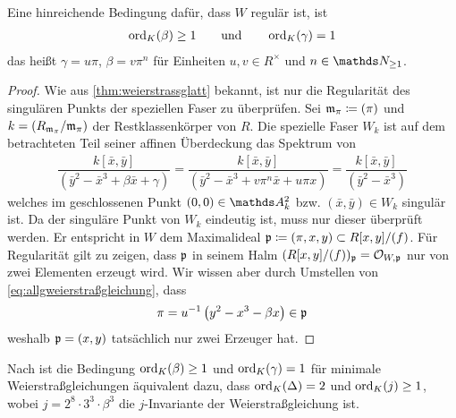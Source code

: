 \begin{Korollar}\label{thm:c1red}
  \label{bem:bedregweierstraßmodell}
  Eine hinreichende Bedingung dafür, dass $W$ regulär ist, ist
  \begin{gather*}
    \operatorname{ord}_{K}(\beta)\geq 1
    \qquad\text{und}\qquad
    \operatorname{ord}_{K}(\gamma)=1
  \end{gather*}
  das heißt $\gamma=u\pi$, $\beta=v\pi^n$ für Einheiten $u,v\in R^\times$
  und $n\in\N_{\geq1}$.

  \begin{proof}
    Wie aus \ref{thm:weierstrassglatt} bekannt, ist nur die
    Regularität des singulären Punkts der speziellen Faser zu
    überprüfen.
    Sei $\mathfrak{m}_\pi\coloneqq(\pi)$ und $k=(R_{\mathfrak{m}_\pi}/\mathfrak{m}_\pi)$ der
    Restklassenkörper von $R$.
    Die spezielle Faser $W_k$ ist auf dem betrachteten Teil seiner
    affinen Überdeckung das Spektrum von 
    \begin{gather*}
      \dfrac{k[\bar x,\bar y]}{(\bar y^2-\bar x^3+\beta \bar x+\gamma)}
      =\dfrac{k[\bar x,\bar y]}{(\bar y^2-\bar x^3+v\pi^n \bar x+u\pi x)}
      =\dfrac{k[\bar x,\bar y]}{(\bar y^2-\bar x^3)}
    \end{gather*}
    welches im geschlossenen Punkt $(0,0)\in\A_k^2$ bzw.
    $(\bar x,\bar y)\in W_k$ singulär ist. Da der singuläre Punkt von
    $W_k$ eindeutig ist, muss nur dieser überprüft werden.
    Er entspricht in $W$ dem Maximalideal
    $\mathfrak{p}\coloneqq(\pi,x,y)\subset R[x,y]/(f)$.
    Für Regularität gilt zu zeigen, dass $\mathfrak{p}$ in seinem Halm
    $(R[x,y]/(f))_{\mathfrak{p}}=\mathcal{O}_{W,\mathfrak{p}}$ nur von zwei Elementen erzeugt wird.
    Wir wissen aber durch Umstellen von
    \eqref{eq:allgweierstraßgleichung}, dass
    \begin{gather*}
      \pi = u^{-1}\left( y^2-x^3-\beta x \right)\in\mathfrak{p}
    \end{gather*}
    weshalb $\mathfrak{p}=(x,y)$ tatsächlich nur zwei Erzeuger hat.
  \end{proof}
\end{Korollar}

\begin{Bemerkung}
Nach \cite[Chapter 1.5, Lemma 3 and Lemma 4]{neron} ist die
Bedingung $\operatorname{ord}_{K}(\beta)\geq 1$ und $\operatorname{ord}_{K}(\gamma)=1$ für
minimale Weierstraßgleichungen äquivalent dazu,
dass $\operatorname{ord}_{K}(\Delta)=2$ und $\operatorname{ord}_{K}(j)\geq 1$,
wobei $j=2^8\cdot 3^3\cdot\beta^3$ die $j$-Invariante der
Weierstraßgleichung ist.
\end{Bemerkung}


